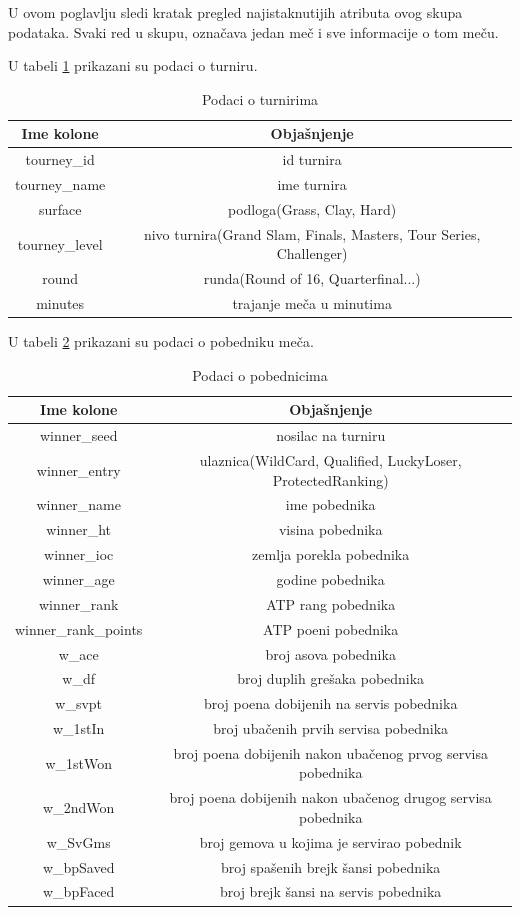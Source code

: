 \documentclass[a4paper]{article}
\begin{document}
U ovom poglavlju sledi kratak pregled najistaknutijih atributa ovog skupa podataka.
Svaki red u skupu, označava jedan meč i sve informacije o tom meču.

U tabeli \ref{table:turnir} prikazani su podaci o turniru.
\begin{table}
		\begin{tabular}{ | c | c | } 
			\hline
			Ime kolone & Objašnjenje \\ 
			\hline
			tourney\_id & id turnira \\
			tourney\_name & ime turnira \\
			surface & podloga(Grass, Clay, Hard) \\
			tourney\_level & nivo turnira(Grand Slam, Finals, Masters, Tour Series, Challenger) \\ 
			round & runda(Round of 16, Quarterfinal...) \\
			minutes & trajanje meča u minutima \\
			\hline
		\end{tabular}
	\caption{Podaci o turnirima}
	\label{table:turnir}
\end{table}

U tabeli \ref{table:pobednici} prikazani su podaci o pobedniku meča.
\begin{table}
		\begin{tabular}{ | c | c | } 
			\hline
			Ime kolone & Objašnjenje \\ 
			\hline
			winner\_seed & nosilac na turniru \\
			winner\_entry & ulaznica(WildCard, Qualified, LuckyLoser, ProtectedRanking) \\
			winner\_name & ime pobednika \\
			winner\_ht & visina pobednika \\
			winner\_ioc & zemlja porekla pobednika \\
			winner\_age & godine pobednika \\
			winner\_rank & ATP rang pobednika \\
			winner\_rank\_points & ATP poeni pobednika \\
			w\_ace & broj asova pobednika \\
			w\_df & broj duplih grešaka pobednika \\ 
			w\_svpt & broj poena dobijenih na servis pobednika \\
			w\_1stIn & broj ubačenih prvih servisa pobednika \\
			w\_1stWon & broj poena dobijenih nakon ubačenog prvog servisa pobednika \\
			w\_2ndWon & broj poena dobijenih nakon ubačenog drugog servisa pobednika \\
			w\_SvGms & broj gemova u kojima je servirao pobednik \\
			w\_bpSaved & broj spašenih brejk šansi pobednika \\
			w\_bpFaced & broj brejk šansi na servis pobednika \\ 
			\hline
		\end{tabular}
	\caption{Podaci o pobednicima}
	\label{table:pobednici}
\end{table}
\end{document}
